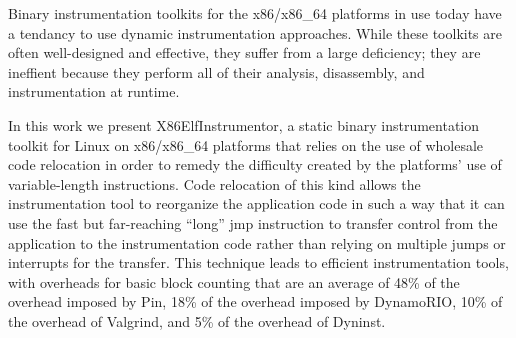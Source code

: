 \begin{it}
Binary instrumentation toolkits for the x86/x86\_64 platforms in use today have a tendancy
to use dynamic instrumentation approaches. While these toolkits
are often well-designed and effective, they suffer from a large deficiency; they
are ineffient because they perform all of their analysis, disassembly, and
instrumentation at runtime.

In this work we present X86ElfInstrumentor, a static binary instrumentation
toolkit for Linux on x86/x86\_64 platforms that relies on the use of wholesale
code relocation in order to remedy the difficulty created by the platforms' use
of variable-length instructions. Code relocation of this kind allows the
instrumentation tool to reorganize the application code in such a way that it
can use the fast but far-reaching ``long'' jmp instruction to transfer control
from the application to the instrumentation code rather than relying on multiple
jumps or interrupts for the transfer. This technique leads to efficient
instrumentation tools, with overheads for basic block counting that are an
average of 48\% of the overhead imposed by Pin, 18\% of the overhead imposed by
DynamoRIO, 10\% of the overhead of Valgrind, and 5\% of the overhead of Dyninst.
\end{it}
